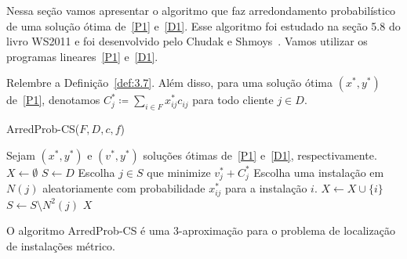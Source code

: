 Nessa seção vamos apresentar o algoritmo que faz arredondamento probabilístico de uma solução ótima de~\eqref{P1} e~\eqref{D1}. Esse algoritmo foi estudado na seção 5.8 do livro WS2011 e foi desenvolvido pelo Chudak e Shmoys~\cite{Chudak2003}. Vamos utilizar os programas lineares~\eqref{P1} e~\eqref{D1}.

Relembre a Definição~\ref{def:3.7}. Além disso, para uma solução ótima $(x^*,y^*)$ de~\eqref{P1}, denotamos $C_j^* \coloneqq \sum_{i \in F} x_{ij}^*c_{ij}$ para todo cliente $j \in D$.  


\begin{algorithm}[tbh]
\caption{\sc ArredProb-CS($F,D,c,f$)}
\begin{algorithmic}[1]
        \State Sejam $(x^*,y^*)$ e $(v^*,y^*)$ soluções ótimas de~\eqref{P1} e~\eqref{D1}, respectivamente.
        \State $X \gets \emptyset$
        \State $S \gets D$
        \State Escolha $j \in S$ que minimize $v^*_j + C^*_j$
        \State Escolha uma instalação em $N(j)$ aleatoriamente com probabilidade $x^*_{ij}$ para a instalação $i$.
        \State $X \gets X \cup \{i\}$
        \State $S \gets S \setminus N^2(j)$
        \EndWhile
        \State \Return $X$
\end{algorithmic}
\end{algorithm}

\begin{theorem} O algoritmo {\sc ArredProb-CS} é uma 3-aproximação para o problema de localização de instalações métrico.
\end{theorem}

